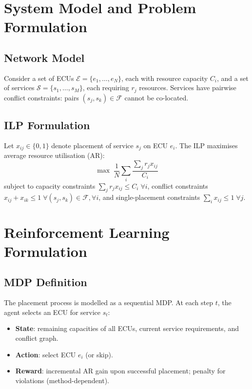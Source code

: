 \documentclass[conference]{IEEEtran}
\begin{document}
\section{System Model and Problem Formulation}

\subsection{Network Model}
Consider a set of ECUs $\mathcal{E} = \{e_1, \dots, e_N\}$, each with
resource capacity $C_i$, and a set of services
$\mathcal{S} = \{s_1, \dots, s_M\}$, each requiring $r_j$ resources.
Services have pairwise conflict constraints: pairs
$(s_j, s_k) \in \mathcal{F}$ cannot be co-located.

\subsection{ILP Formulation}
Let $x_{ij} \in \{0,1\}$ denote placement of service $s_j$ on ECU $e_i$.
The ILP maximises average resource utilisation (AR):
\begin{equation}
  \max \; \frac{1}{N} \sum_{i} \frac{\sum_j r_j x_{ij}}{C_i}
  \label{eq:obj}
\end{equation}
subject to capacity constraints
$\sum_j r_j x_{ij} \leq C_i \; \forall i$,
conflict constraints
$x_{ij} + x_{ik} \leq 1 \; \forall (s_j,s_k)\in\mathcal{F}, \forall i$,
and single-placement constraints
$\sum_i x_{ij} \leq 1 \; \forall j$.

\section{Reinforcement Learning Formulation}

\subsection{MDP Definition}
The placement process is modelled as a sequential MDP.
At each step $t$, the agent selects an ECU for service $s_t$:
\begin{itemize}
  \item \textbf{State}: remaining capacities of all ECUs, current service
        requirements, and conflict graph.
  \item \textbf{Action}: select ECU $e_i$ (or skip).
  \item \textbf{Reward}: incremental AR gain upon successful placement;
        penalty for violations (method-dependent).
\end{itemize}
\end{document}
